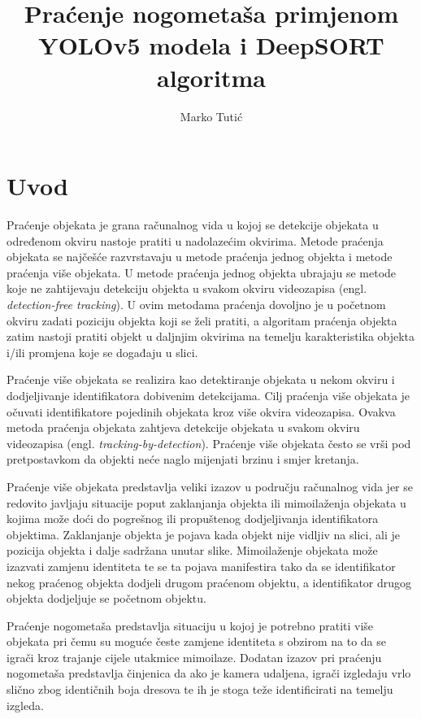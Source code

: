 \documentclass[times, utf8, seminar, numeric]{fer}
\begin{document}
\title{Praćenje nogometaša primjenom YOLOv5 modela i DeepSORT algoritma}

\author{Marko Tutić}
\maketitle

\tableofcontents

\chapter{Uvod}



Praćenje objekata je grana računalnog vida u kojoj se detekcije objekata u određenom okviru nastoje pratiti u nadolazećim okvirima.
Metode praćenja objekata se najčešće razvrstavaju u metode praćenja jednog objekta i metode praćenja više objekata. 
U metode praćenja jednog objekta ubrajaju se metode koje ne zahtijevaju detekciju objekta u svakom okviru videozapisa (engl. \textit{detection-free tracking}). U ovim metodama praćenja dovoljno je u početnom okviru zadati poziciju objekta koji se želi pratiti, a algoritam praćenja objekta zatim nastoji pratiti objekt u daljnjim okvirima na temelju karakteristika objekta i/ili promjena koje se događaju u slici.

Praćenje više objekata se realizira kao detektiranje objekata u nekom okviru i dodjeljivanje identifikatora dobivenim detekcijama. Cilj praćenja više objekata je očuvati identifikatore pojedinih objekata kroz više okvira videozapisa. Ovakva metoda praćenja objekata zahtjeva detekcije objekata u svakom okviru videozapisa (engl. \textit{tracking-by-detection}).
Praćenje više objekata često se vrši pod pretpostavkom da objekti neće naglo mijenjati brzinu i smjer kretanja.

Praćenje više objekata predstavlja veliki izazov u području računalnog vida jer se redovito javljaju situacije  poput zaklanjanja objekta ili mimoilaženja objekata u kojima može doći do pogrešnog ili propuštenog dodjeljivanja identifikatora objektima.
Zaklanjanje objekta je pojava kada objekt nije vidljiv na slici, ali je pozicija objekta i dalje sadržana unutar slike.
Mimoilaženje objekata može izazvati zamjenu identiteta te se ta pojava manifestira tako da se identifikator nekog praćenog objekta dodjeli drugom praćenom objektu, a identifikator drugog objekta dodjeljuje se početnom objektu. 


Praćenje nogometaša predstavlja situaciju u kojoj je potrebno pratiti više objekata pri čemu su moguće česte zamjene identiteta s obzirom na to da se igrači kroz trajanje cijele utakmice mimoilaze. Dodatan izazov pri praćenju nogometaša predstavlja činjenica da ako je kamera udaljena, igrači izgledaju vrlo slično zbog identičnih boja dresova te ih je stoga teže identificirati na temelju izgleda.
\end{document}
